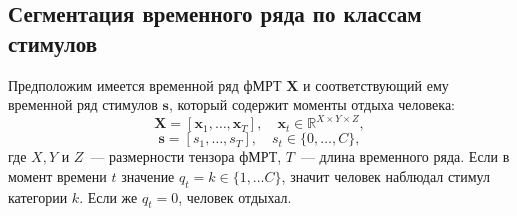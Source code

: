 \documentclass[a4paper, 12pt]{extarticle}
\begin{document}
\subsection{Сегментация временного ряда по классам стимулов}
Предположим имеется временной ряд фМРТ $\bm{X}$ и соответствующий ему временной ряд стимулов $\bm{s}$, который содержит моменты отдыха человека:
\begin{equation*}
\bm{X} = \left[\bm{x}_{1}, \ldots, \bm{x}_{T}\right], \quad \bm{x}_{t} \in \mathbb{R}^{X \times Y \times Z},
\end{equation*}
\begin{equation*}
\bm{s} = \left[{s}_{1}, \ldots, {s}_{T}\right], \quad {s}_{t} \in \{0,\dots, C\},
\end{equation*}
где $X, Y$ и $Z$~--- размерности тензора фМРТ, $T$~--- длина временного ряда.  
Если в момент времени $t$ значение $q_t = k \in \{1, \dots C\}$, значит человек наблюдал стимул категории $k$. 
Если же $q_t = 0$, человек отдыхал.
\end{document}
